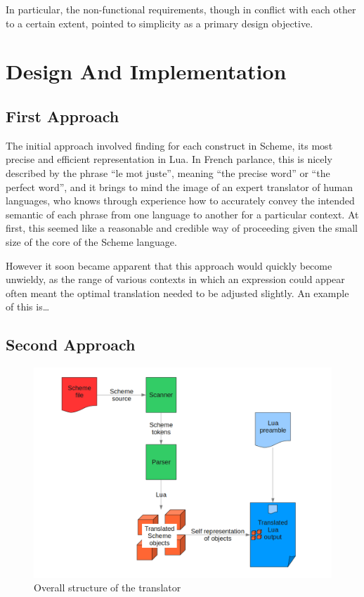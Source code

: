 In particular, the non-functional requirements, though in conflict with each
other to a certain extent, pointed to simplicity as a primary design objective.


\section{Design And Implementation}


\subsection{First Approach}

The initial approach involved finding for each construct in Scheme, its most
precise and efficient representation in Lua. In French parlance, this is nicely
described by the phrase ``le mot juste'', meaning ``the precise word'' or ``the
perfect word'', and it brings to mind the image of an expert translator of
human languages, who knows through experience how to accurately convey the
intended semantic of each phrase from one language to another for a particular
context.  At first, this seemed like a reasonable and credible way of
proceeding given the small size of the core of the Scheme language.

However it soon became apparent that this approach would quickly become
unwieldy, as the range of various contexts in which an expression could appear
often meant the optimal translation needed to be adjusted slightly. An example
of this is\ldots

\subsection{Second Approach}

\begin{figure}
\centering
\includegraphics[width=\textwidth]{overview.png}
\caption{Overall structure of the translator}
\label{fig:overview}
\end{figure}

